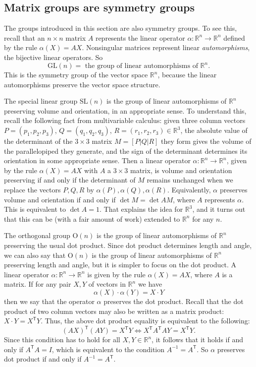 \documentclass[11pt]{article}
\theoremstyle{definition}
\newcommand{\R}{\mathbb{R}} %
\renewcommand{\iff}{\Leftrightarrow}
\newcommand{\GL}{\mathrm{GL}}
\newcommand{\SL}{\mathrm{SL}}
\newcommand{\Orth}{\mathrm{O}}
\newcommand{\transpose}{\mathsf{T}}
\begin{document}
\subsection*{Matrix groups are symmetry groups}\noindent
The groups introduced in this section are also symmetry groups. To see
this, recall that an $n \times n$ matrix $A$ represents the linear
operator $\alpha: \R^n \to \R^n$ defined by the rule $\alpha(X) =
AX$. Nonsingular matrices represent linear \emph{automorphisms}, the
bijective linear operators. So 
\[
  \GL(n) = \text{ the group of linear automorphisms of } \R^n.
\]
This is the symmetry group of the vector space $\R^n$, because the
linear automorphisms preserve the vector space structure.

The special linear group $\SL(n)$ is the group of linear automorphisms
of $\R^n$ preserving volume and orientation, in an appropriate
sense. To understand this, recall the following fact from
multivariable calculus: given three column vectors $P=(p_1, p_2,
p_3)$, $Q=(q_1, q_2, q_3)$, $R=(r_1, r_2, r_3) \in \R^3$, the absolute
value of the determinant of the $3 \times 3$ matrix $M = [P|Q|R]$ they
form gives the volume of the parallelopiped they generate, and the
sign of the determinant determines its orientation in some appropriate
sense. Then a linear operator $\alpha: \R^n \to \R^n$, given by the
rule $\alpha(X) = AX$ with $A$ a $3 \times 3$ matrix, is volume and
orientation preserving if and only if the determinant of $M$ remains
unchanged when we replace the vectors $P, Q, R$ by $\alpha(P),
\alpha(Q), \alpha(R)$. Equivalently, $\alpha$ preserves volume and
orientation if and only if $\det M = \det AM$, where $A$ represents
$\alpha$. This is equivalent to $\det A = 1$. That explains the idea
for $\R^3$, and it turns out that this can be (with a fair amount of
work) extended to $\R^n$ for any $n$.

The orthogonal group $\Orth(n)$ is the group of linear automorphisms
of $\R^n$ preserving the usual dot product. Since dot product
determines length and angle, we can also say that $\Orth(n)$ is the
group of linear automorphisms of $\R^n$ preserving length and angle,
but it is simpler to focus on the dot product. A linear operator
$\alpha: \R^n \to \R^n$ is given by the rule $\alpha(X) = AX$, where
$A$ is a matrix. If for any pair $X,Y$ of vectors in $\R^n$ we have
\[
  \alpha(X) \cdot \alpha(Y) = X \cdot Y 
\]
then we say that the operator $\alpha$ preserves the dot
product. Recall that the dot product of two column vectors may also be
written as a matrix product: $X \cdot Y = X^\transpose Y$. Thus, the
above dot product equality is equivalent to the following:
\[
  (AX)^\transpose (AY) = X^\transpose Y \iff X^\transpose A^\transpose
A Y = X^\transpose Y.
\]
Since this condition has to hold for all $X,Y \in \R^n$, it follows
that it holds if and only if $A^\transpose A = I$, which is equivalent
to the condition $A^{-1} = A^\transpose$. So $\alpha$ preserves dot
product if and only if $A^{-1} = A^\transpose$.
\end{document}
